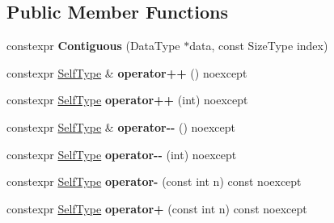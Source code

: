 \subsection*{Public Member Functions}
\begin{DoxyCompactItemize}
\item 
\mbox{\label{classbzd_1_1iterator_1_1Contiguous_a9fc2da38f13c81cfdce278a29e9c9e07}} 
constexpr {\bfseries Contiguous} (Data\+Type $\ast$data, const Size\+Type index)
\item 
\mbox{\label{classbzd_1_1iterator_1_1Contiguous_aac30fd820014441e9ae1524316582630}} 
constexpr \hyperlink{classbzd_1_1iterator_1_1Contiguous}{Self\+Type} \& {\bfseries operator++} () noexcept
\item 
\mbox{\label{classbzd_1_1iterator_1_1Contiguous_afc2347ed56812c7fa01b605ad8fd8403}} 
constexpr \hyperlink{classbzd_1_1iterator_1_1Contiguous}{Self\+Type} {\bfseries operator++} (int) noexcept
\item 
\mbox{\label{classbzd_1_1iterator_1_1Contiguous_ab149dbd4d2a9aaad200298e6a1050a8a}} 
constexpr \hyperlink{classbzd_1_1iterator_1_1Contiguous}{Self\+Type} \& {\bfseries operator-\/-\/} () noexcept
\item 
\mbox{\label{classbzd_1_1iterator_1_1Contiguous_a2bef3299e9458a8c25da681927188a0f}} 
constexpr \hyperlink{classbzd_1_1iterator_1_1Contiguous}{Self\+Type} {\bfseries operator-\/-\/} (int) noexcept
\item 
\mbox{\label{classbzd_1_1iterator_1_1Contiguous_a4dc3619003d01fc1fdb2f479160bcfea}} 
constexpr \hyperlink{classbzd_1_1iterator_1_1Contiguous}{Self\+Type} {\bfseries operator-\/} (const int n) const noexcept
\item 
\mbox{\label{classbzd_1_1iterator_1_1Contiguous_a73dd951c956717c0d3cde7d0ac300848}} 
constexpr \hyperlink{classbzd_1_1iterator_1_1Contiguous}{Self\+Type} {\bfseries operator+} (const int n) const noexcept
\item 
\mbox{\label{classbzd_1_1iterator_1_1Contiguous_a3afb7f7909cca3f8f25023430eb19fc0}} 

\end{DoxyCompactItemize}
